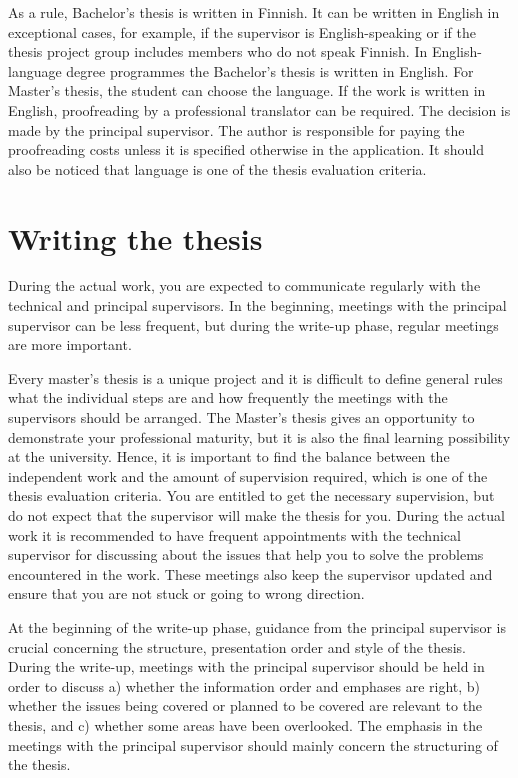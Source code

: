 As a rule, Bachelor's thesis is written in Finnish. It can be written in English in exceptional cases, for example, if the supervisor is English-speaking or if the thesis project group includes members who do not speak Finnish. In English-language degree programmes the Bachelor's thesis is written in English. For Master's thesis, the student can choose the language. If the work is written in English, proofreading by a professional translator can be required. The decision is made by the principal supervisor. The author is responsible for paying the proofreading costs unless it is specified otherwise in the application. It should also be noticed that language is one of the thesis evaluation criteria.

\section{Writing the thesis}
\label{writing}

During the actual work, you are expected to communicate regularly with the technical and principal supervisors. In the beginning, meetings with the principal supervisor can be less frequent, but during the write-up phase, regular meetings are more important.

Every master’s thesis is a unique project and it is difficult to define general rules what the individual steps are and how frequently the meetings with the supervisors should be arranged. The Master's thesis gives an opportunity to demonstrate your professional maturity, but it is also the final learning possibility at the university. Hence, it is important to find the balance between the independent work and the amount of supervision required, which is one of the thesis evaluation criteria. You are entitled to get the necessary supervision, but do not expect that the supervisor will make the thesis for you. During the actual work it is recommended to have frequent appointments with the technical supervisor for discussing about the issues that help you to solve the problems encountered in the work. These meetings also keep the supervisor updated and ensure that you are not stuck or going to wrong direction.

At the beginning of the write-up phase, guidance from the principal supervisor is crucial concerning the structure, presentation order and style of the thesis. During the write-up, meetings with the principal supervisor should be held in order to discuss a) whether the information order and emphases are right, b) whether the issues being covered or planned to be covered are relevant to the thesis, and c) whether some areas have been overlooked. The emphasis in the meetings with the principal supervisor should mainly concern the structuring of the thesis.

